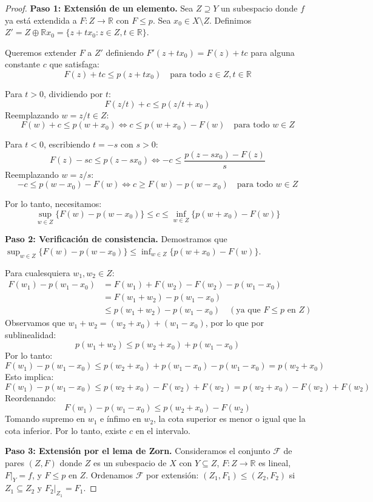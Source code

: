 \documentclass[11pt,a4paper]{article}
\theoremstyle{plain}
\theoremstyle{definition}
\begin{document}
\begin{proof}
\textbf{Paso 1: Extensión de un elemento.} Sea $Z \supseteq Y$ un subespacio donde $f$ ya está extendida a $F: Z \to \mathbb{R}$ con $F \leq p$. Sea $x_0 \in X \setminus Z$. Definimos $Z' = Z \oplus \mathbb{R} x_0 = \{z + t x_0 : z \in Z, t \in \mathbb{R}\}$.

Queremos extender $F$ a $Z'$ definiendo $F'(z + t x_0) = F(z) + t c$ para alguna constante $c$ que satisfaga:
\[
F(z) + t c \leq p(z + t x_0) \quad \text{para todo } z \in Z, t \in \mathbb{R}
\]

Para $t > 0$, dividiendo por $t$:
\[
F(z/t) + c \leq p(z/t + x_0)
\]
Reemplazando $w = z/t \in Z$:
\[
F(w) + c \leq p(w + x_0) \iff c \leq p(w + x_0) - F(w) \quad \text{para todo } w \in Z
\]

Para $t < 0$, escribiendo $t = -s$ con $s > 0$:
\[
F(z) - s c \leq p(z - s x_0) \iff -c \leq \frac{p(z - s x_0) - F(z)}{s}
\]
Reemplazando $w = z/s$:
\[
-c \leq p(w - x_0) - F(w) \iff c \geq F(w) - p(w - x_0) \quad \text{para todo } w \in Z
\]

Por lo tanto, necesitamos:
\[
\sup_{w \in Z} \{F(w) - p(w - x_0)\} \leq c \leq \inf_{w \in Z} \{p(w + x_0) - F(w)\}
\]

\textbf{Paso 2: Verificación de consistencia.} Demostramos que $\sup_{w \in Z} \{F(w) - p(w - x_0)\} \leq \inf_{w \in Z} \{p(w + x_0) - F(w)\}$.

Para cualesquiera $w_1, w_2 \in Z$:
\begin{align*}
F(w_1) - p(w_1 - x_0) &= F(w_1) + F(w_2) - F(w_2) - p(w_1 - x_0) \\
&= F(w_1 + w_2) - p(w_1 - x_0) \\
&\leq p(w_1 + w_2) - p(w_1 - x_0) \quad (\text{ya que } F \leq p \text{ en } Z)
\end{align*}
Observamos que $w_1 + w_2 = (w_2 + x_0) + (w_1 - x_0)$, por lo que por sublinealidad:
\[
p(w_1 + w_2) \leq p(w_2 + x_0) + p(w_1 - x_0)
\]
Por lo tanto:
\[
F(w_1) - p(w_1 - x_0) \leq p(w_2 + x_0) + p(w_1 - x_0) - p(w_1 - x_0) = p(w_2 + x_0)
\]
Esto implica:
\[
F(w_1) - p(w_1 - x_0) \leq p(w_2 + x_0) - F(w_2) + F(w_2) = p(w_2 + x_0) - F(w_2) + F(w_2)
\]
Reordenando:
\[
F(w_1) - p(w_1 - x_0) \leq p(w_2 + x_0) - F(w_2)
\]
Tomando supremo en $w_1$ e ínfimo en $w_2$, la cota superior es menor o igual que la cota inferior. Por lo tanto, existe $c$ en el intervalo.

\textbf{Paso 3: Extensión por el lema de Zorn.} Consideramos el conjunto $\mathcal{F}$ de pares $(Z, F)$ donde $Z$ es un subespacio de $X$ con $Y \subseteq Z$, $F: Z \to \mathbb{R}$ es lineal, $F|_Y = f$, y $F \leq p$ en $Z$. Ordenamos $\mathcal{F}$ por extensión: $(Z_1, F_1) \leq (Z_2, F_2)$ si $Z_1 \subseteq Z_2$ y $F_2|_{Z_1} = F_1$.


\end{proof}
\end{document}
